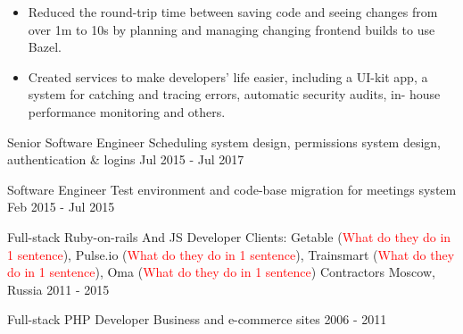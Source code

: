 \begin{cventries}
{\begin{itemize}
            \item {Reduced the round-trip time between saving code and seeing changes from over 1m to 10s by planning and managing changing frontend builds to use Bazel.}
            \item {Created services to make developers’ life easier, including a UI-kit app, a system for catching and tracing errors, automatic security audits, in- house performance monitoring and others.}
        \end{itemize}
    }

    \cvblitz
    {Senior Software Engineer} %
    {Scheduling system design, permissions system design, authentication \& logins} %
    {} %
    {} %
    {Jul 2015 - Jul 2017} %

    \cvblitz
    {Software Engineer} %
    {Test environment and code-base migration for meetings system} %
    {} %
    {} %
    {Feb 2015 - Jul 2015} %




    \cvblitz
    {Full-stack Ruby-on-rails And JS Developer} %
    {Clients: Getable (\textcolor{red}{What do they do in 1 sentence}), Pulse.io (\textcolor{red}{What do they do in 1 sentence}), Trainsmart (\textcolor{red}{What do they do in 1 sentence}), Oma (\textcolor{red}{What do they do in 1 sentence})} %
    {Contractors} %
    {Moscow, Russia} %
    {2011 - 2015} %

    \cvblitz
    {Full-stack PHP Developer} %
    {Business and e-commerce sites} %
    {} %
    {} %
    {2006 - 2011} %

\end{cventries}

